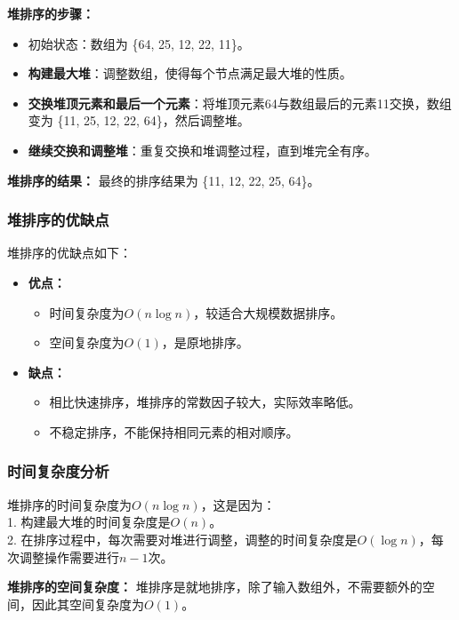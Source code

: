 \documentclass{article}
\begin{document}
\noindent
\textbf{堆排序的步骤：}
\begin{itemize}
    \item 初始状态：数组为 \{64, 25, 12, 22, 11\}。
    \item \textbf{构建最大堆}：调整数组，使得每个节点满足最大堆的性质。
    \item \textbf{交换堆顶元素和最后一个元素}：将堆顶元素64与数组最后的元素11交换，数组变为 \{11, 25, 12, 22, 64\}，然后调整堆。
    \item \textbf{继续交换和调整堆}：重复交换和堆调整过程，直到堆完全有序。
\end{itemize}

\noindent
\textbf{堆排序的结果：}
最终的排序结果为 \{11, 12, 22, 25, 64\}。

\subsubsection{堆排序的优缺点}
堆排序的优缺点如下：

\begin{itemize}
    \item \textbf{优点：}
    \begin{itemize}
        \item 时间复杂度为$O(n \log n)$，较适合大规模数据排序。
        \item 空间复杂度为$O(1)$，是原地排序。
    \end{itemize}
    \item \textbf{缺点：}
    \begin{itemize}
        \item 相比快速排序，堆排序的常数因子较大，实际效率略低。
        \item 不稳定排序，不能保持相同元素的相对顺序。
    \end{itemize}
\end{itemize}

\subsubsection{时间复杂度分析}
堆排序的时间复杂度为$O(n \log n)$，这是因为：\\
1. 构建最大堆的时间复杂度是$O(n)$。\\
2. 在排序过程中，每次需要对堆进行调整，调整的时间复杂度是$O(\log n)$，每次调整操作需要进行$n-1$次。

\noindent
\textbf{堆排序的空间复杂度：}
堆排序是就地排序，除了输入数组外，不需要额外的空间，因此其空间复杂度为$O(1)$。
\end{document}
